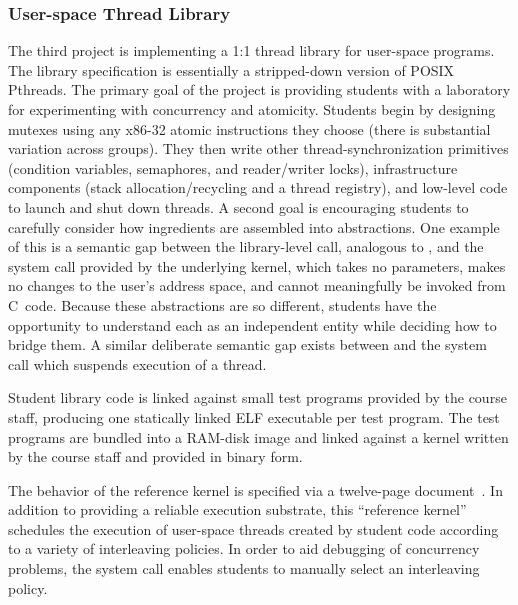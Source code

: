 \subsubsection{User-space Thread Library}
The third project is implementing a 1:1 thread library for
user-space programs.
The library specification is essentially a stripped-down
version of POSIX Pthreads.
The primary goal of the project is providing students
with a laboratory for
experimenting with concurrency and atomicity.
Students begin by designing mutexes using any
x86-32 atomic instructions they choose
(there is substantial variation across groups).
They then write other thread-synchronization
primitives (condition variables, semaphores,
and reader/writer locks), infrastructure
components (stack allocation/recycling and
a thread registry),
and low-level code to launch and shut down
threads.
A second goal is encouraging students to carefully
consider how ingredients are assembled into
abstractions.
One example of this is a semantic gap
between the library-level 
call, analogous to ,
and the  system call provided
by the underlying kernel,
which takes no parameters,
makes no changes to the user's address space,
and cannot meaningfully
be invoked from C~code.
Because these abstractions are so different,
students have the opportunity to
understand each as an independent entity while
deciding how to bridge them.
A similar deliberate semantic gap exists between
 and the system call
which suspends execution of a thread.

Student library code is linked against small
test programs provided by the course staff,
producing one statically linked ELF executable
per test program.
The test programs are bundled into a RAM-disk
image and linked against a kernel written by
the course staff
and provided in binary form.

The behavior of the reference kernel is specified
via a twelve-page document~\cite{kspec}.
In addition to providing a reliable execution
substrate,
this ``reference kernel'' schedules
the execution of user-space threads created by
student code according to a variety of
interleaving policies.
In order to aid debugging of concurrency problems,
the  system call enables
students to manually select an interleaving policy.

